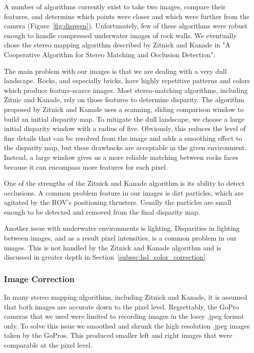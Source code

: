 \documentclass[a4paper,twoside]{article}
\begin{document}
A number of algorithms currently exist to take two images, compare their features, and determine which points were closer and which were further from the camera (Figure~\ref{fig:dispgen}). 
Unfortunately, few of these algorithms were robust enough to handle compressed underwater images of rock walls.
We eventually chose the stereo mapping algorithm described by Zitnick and Kanade in "A Cooperative Algorithm for Stereo Matching and Occlusion Detection".

The main problem with our images is that we are dealing with a very dull landscape.  
Rocks, and especially bricks, have highly repetitive patterns and colors which produce feature-scarce images.
Most stereo-matching algorithms, including Zitnic and Kanade, rely on those features to determine disparity.  
The algorithm proposed by Zitnick and Kanade uses a scanning, sliding comparison window to build an initial disparity map.  
To mitigate the dull landscape, we choose a large initial disparity window with a radius of five. 
Obviously, this reduces the level of fine details that can be resolved from the image and adds a smoothing effect to the disparity map, but these drawbacks are acceptable in the given environment.  
Instead, a large window gives us a more reliable matching between rocks faces because it can encompass more features for each pixel.  

One of the strengths of the Zitnick and Kanade algorithm is its ability to detect occlusions.  
A common problem feature in our images is dirt particles, which are agitated by the ROV's positioning thrusters.
Usually the particles are small enough to be detected and removed from the final disparity map.

Another issue with underwater environments is lighting.
  Disparities in lighting between images, and as a result pixel intensities, is a common problem in our images.  
This is not handled by the Zitnick and Kanade algorithm and is discussed in greater depth in Section~\ref{subsec:hsl_color_correction}.


\subsubsection{Image Correction}
\label{subsec:image_correction}

In many stereo mapping algorithms, including Zitnick and Kanade, it is assumed that both images are accurate down to the pixel level.
Regrettably, the GoPro cameras that we used were limited to recording images in the lossy .jpeg format only.
To solve this issue we smoothed and shrunk the high resolution .jpeg images taken by the GoPros. 
This produced smaller left and right images that were comparable at the pixel level.
\end{document}
